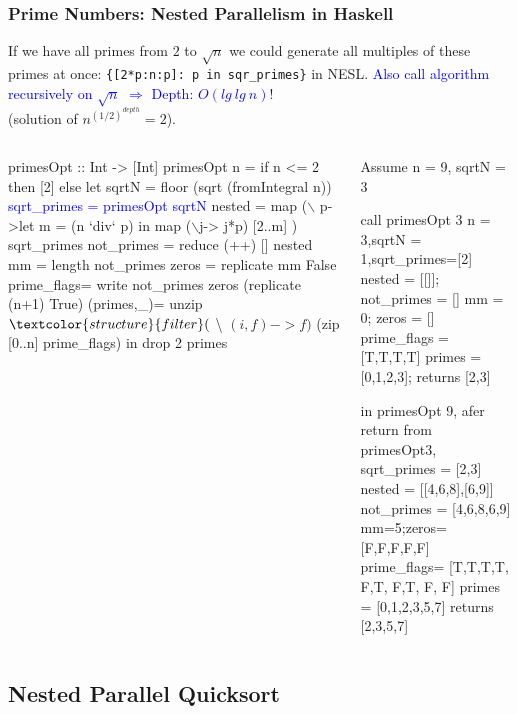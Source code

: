 \documentclass{beamer}
\newcommand{\blue}[1]{\textcolor{Blue}{{#1}}}
\renewcommand{\emph}[1]{\textcolor{structure}{#1}}
\newcommand{\emp}[1]{\textcolor{DikuRed}{ #1}}
\newcommand{\mymath}[1]{$ #1 $}
\begin{document}
\begin{frame}[fragile,t]
  \frametitle{Prime Numbers: Nested Parallelism in Haskell}
\vspace{-2ex}
If we have all primes from $2$ to $\sqrt{n}$ we could
generate all multiples of these primes at once:
\emp{\tt \{[2*p:n:p]: p in sqr\_primes\}} in NESL.
\blue{Also call algorithm recursively on $\sqrt{n}$ $\Rightarrow$ Depth: $O(lg \ lg \ n)$!}\\
(solution of $n^{(1/2)^{depth}}=2$).
\pause
\begin{columns}
\begin{colorcode}[fontsize=\scriptsize]
primesOpt :: Int -> [Int]
primesOpt n = 
  if n <= 2 then [2]
  else 
   let sqrtN = floor (sqrt (fromIntegral n))
       \blue{sqrt_primes = primesOpt sqrtN}
       nested = \emp{map} (\mymath{\backslash}\emp{p}->let m = (n `div` p) 
                         in  \emp{map} (\mymath{\backslash}j-> j*p)
                                 [2..m]
                    ) \emp{sqrt_primes}
       not_primes  = \emph{reduce} (++) [] nested
       mm = length not_primes
       zeros = \emph{replicate} mm False 
       prime_flags= \emph{write} not_primes zeros 
                    \emph{(replicate} (n+1) True)
       (primes,_)= unzip $ \emph{filter} (\mymath{\backslash}(i,f)->f) 
                    $ (zip [0..n] prime_flags)
   in drop 2 primes
\end{colorcode}
\pause
\begin{colorcode}[fontsize=\scriptsize]
Assume n = 9, sqrtN = 3 

call primesOpt 3
n = 3,sqrtN = 1,sqrt_primes=[2]
nested = [[]]; not\_primes = [] 
mm = 0; zeros = []
prime_flags = [T,T,T,T]
primes = [0,1,2,3]; returns [2,3]

in primesOpt 9, afer 
return from primesOpt3,
sqrt_primes = [2,3]
nested = [[4,6,8],[6,9]]
not_primes = [4,6,8,6,9]
mm=5;zeros= [F,F,F,F,F]
prime_flags= [T,T,T,T,\emp{F},T,\emp{F},T,\emp{F},\emp{F}]
primes = [0,1,2,3,5,7]
returns [2,3,5,7]
\end{colorcode}
\end{columns}

\end{frame}

\subsection{Nested Parallel Quicksort}
\end{document}
